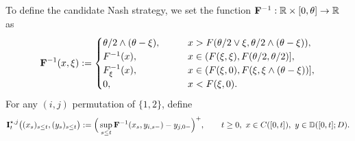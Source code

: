 \documentclass[10pt]{article}
\numberwithin{equation}{section}
\theoremstyle{plain}
\numberwithin{theorem}{section}
\theoremstyle{definition}
\def \R {\mathbb{R}}
\newcommand{\<}{\langle}
\renewcommand{\>}{\rangle}
\renewcommand{\(}{\left(}
\renewcommand{\)}{\right)}
\newcommand{\NCL}[1]{\mathbb{D} ([0,{#1}];D)}
\newcommand\contr{{\bf I}}
\def \R  {{\mathbb {R}}}
\def \R {{\mathbb {R}}}
\begin{document}
{{{{To define the candidate Nash strategy,} we set the function ${\bf F}^{-1}:\R\times[0,\theta]\to \R$ as
\begin{equation}\label{eq:F_bold}
{\bf F}^{-1}(x,\xi) := 
\begin{cases}
\theta/2 \wedge (\theta -\xi), & \qquad x >  F({\theta/2\vee \xi},\theta/2\wedge(\theta-\xi)),\\
 F^{-1}(x) ,      & \qquad  x\in ( F(\xi,\xi) , F(\theta/2,\theta/2)],\\
F_{\xi}^{-1}(x) ,      &\qquad x\in ( F(\xi,0) , F(\xi,\xi\wedge (\theta-\xi) ) ],\\
0  ,      & \qquad %
x <  F(\xi,0).
\end{cases}
\end{equation}
For any $(i,j)$ permutation of $\{1,2\}$, define
\begin{equation}\label{eq:I_markov_star_tris}
\contr^{\star,j}_t\big((x_s)_{s\leq t},(y_s)_{s\leq t}\big): = \Big( \sup_{s\leq t} {\bf F}^{-1}(x_s,y_{i,s-}) - y_{j,0-} \Big)^+ , \qquad t\geq 0, \ x\in C([0,t]), \ y\in \NCL{t}.
\end{equation}


}}}
\end{document}
